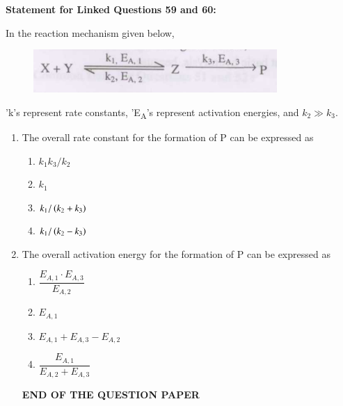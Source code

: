 \documentclass[journal,12pt,onecolumn]{IEEEtran}
\theoremstyle{remark}
\begin{document}
\textbf{Statement for Linked Questions 59 and 60:}

In the reaction mechanism given below,
\begin{figure}[H]
    \centering
    \includegraphics[width=0.8\columnwidth]{q59}
    \caption*{}
    \label{fig:q59}
\end{figure}
\noindent
{'k's represent rate constants, 'E\textsubscript{A}'s represent activation energies, and $k_2 \gg k_3$.}
 \begin{enumerate}[resume]
\item The overall rate constant  for the formation of P can be expressed as

\begin{enumerate}
  \item $k_1 k_3 / k_2$
  \item $k_1$
  \item $k_1 / \left(k_2 + k_3\right)$
  \item $k_1 / \left(k_2 - k_3\right)$
  \hfill{}
\end{enumerate}


\item The overall activation energy  for the formation 
 of P can be expressed as

\begin{enumerate}
  \item $\dfrac{E_{A,1} \cdot E_{A,3}}{E_{A,2}}$
  \item $E_{A,1}$
  \item $E_{A,1} + E_{A,3} - E_{A,2}$
  \item $\dfrac{E_{A,1}}{E_{A,2} + E_{A,3}}$
  \hfill{}
\end{enumerate}





\begin{center}
    
\textbf{END OF THE QUESTION PAPER}
\end{center}  \end{enumerate}
\end{document}
